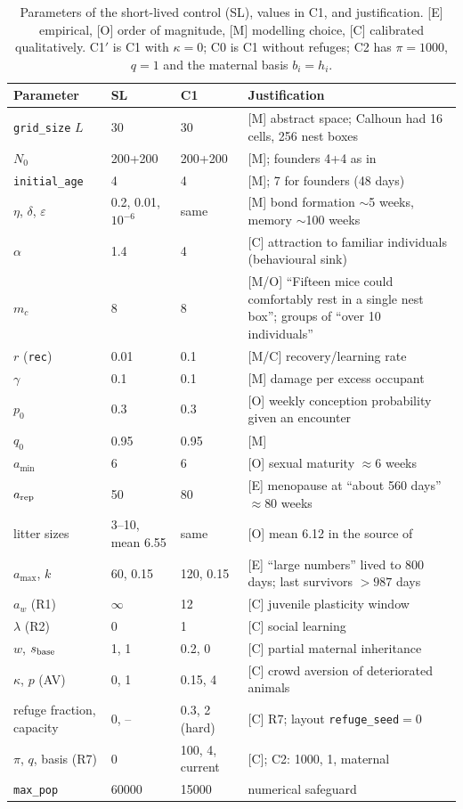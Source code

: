 \documentclass[pre,onecolumn,superscriptaddress,notitlepage]{revtex4-2}
\begin{document}
\begin{table}[ht]
\centering\small
\caption{Parameters of the short-lived control (SL), values in \textsf{C1}, and justification. [E] empirical, [O]
order of magnitude, [M] modelling choice, [C] calibrated qualitatively. \textsf{C1}$'$ is \textsf{C1} with
$\kappa=0$; \textsf{C0} is \textsf{C1} without refuges; \textsf{C2} has $\pi=1000$, $q=1$ and the maternal basis
$b_i=h_i$.}
\label{tab:odd-params}
\begin{tabular}{@{}p{}p{}p{}p{}@{}}
\toprule
Parameter & SL & \textsf{C1} & Justification \\
\midrule
\texttt{grid\_size} $L$ & 30 & 30 & [M] abstract space; Calhoun had 16 cells, 256 nest boxes \\
$N_0$ & 200+200 & 200+200 & [M]; founders 4+4 as in \cite{Calhoun1973} \\
\texttt{initial\_age} & 4 & 4 & [M]; 7 for founders (48 days) \\
$\eta$, $\delta$, $\varepsilon$ & 0.2, 0.01, $10^{-6}$ & same & [M] bond formation $\sim$5 weeks, memory $\sim$100 weeks \\
$\alpha$ & 1.4 & 4 & [C] attraction to familiar individuals (behavioural sink) \\
$m_c$ & 8 & 8 & [M/O] ``Fifteen mice could comfortably rest in a single nest box''; groups of ``over 10 individuals'' \cite{Calhoun1973} \\
$r$ (\texttt{rec}) & 0.01 & 0.1 & [M/C] recovery/learning rate \\
$\gamma$ & 0.1 & 0.1 & [M] damage per excess occupant \\
$p_0$ & 0.3 & 0.3 & [O] weekly conception probability given an encounter \\
$q_0$ & 0.95 & 0.95 & [M] \\
$a_{\min}$ & 6 & 6 & [O] sexual maturity $\approx$6 weeks \\
$a_{\rm rep}$ & 50 & 80 & [E] menopause at ``about 560 days'' $\approx$80 weeks \cite{Calhoun1973} \\
litter sizes & 3--10, mean 6.55 & same & [O] mean 6.12 in the source of \cite{GwizdallaDus2026} \\
$a_{\max}$, $k$ & 60, 0.15 & 120, 0.15 & [E] ``large numbers'' lived to 800 days; last survivors $>987$ days \cite{Calhoun1973} \\
$a_w$ (R1) & $\infty$ & 12 & [C] juvenile plasticity window \\
$\lambda$ (R2) & 0 & 1 & [C] social learning \\
$w$, $s_{\rm base}$ & 1, 1 & 0.2, 0 & [C] partial maternal inheritance \\
$\kappa$, $p$ (AV) & 0, 1 & 0.15, 4 & [C] crowd aversion of deteriorated animals \\
refuge fraction, capacity & 0, -- & 0.3, 2 (hard) & [C] R7; layout \texttt{refuge\_seed}${}=0$ \\
$\pi$, $q$, basis (R7) & 0 & 100, 4, current & [C]; \textsf{C2}: 1000, 1, maternal \\
\texttt{max\_pop} & 60000 & 15000 & numerical safeguard \\
\bottomrule
\end{tabular}
\end{table}
\end{document}
